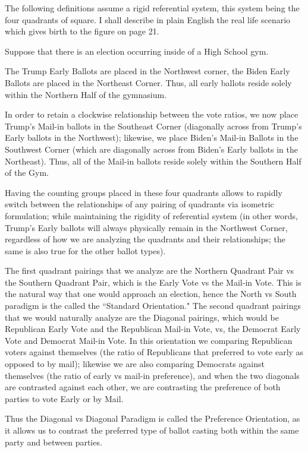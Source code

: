 The following definitions assume a rigid referential system, this system being the four quadrants of square. I shall describe in plain English the real life scenario which gives birth to the figure on page 21.

Suppose that there is an election occurring inside of a High School gym. 

The Trump Early Ballots are placed in the Northwest corner, the Biden Early Ballots are placed in the Northeast Corner. Thus, all early ballots reside solely within the Northern Half of the gymnasium.

In order to retain a clockwise relationship between the vote ratios, we now place Trump's Mail-in ballots in the Southeast Corner (diagonally across from Trump's Early ballots in the Northwest); likewise, we place Biden's Mail-in Ballots in the Southwest Corner (which are diagonally across from Biden's Early ballots in the Northeast). Thus, all of the Mail-in ballots reside solely within the Southern Half of the Gym.

Having the counting groups placed in these four quadrants allows to rapidly switch between the relationships of any pairing of quadrants via isometric formulation; while maintaining the rigidity of referential system (in other words, Trump's Early ballots will always physically remain in the Northwest Corner, regardless of how we are analyzing the quadrants and their relationships; the same is also true for the other ballot types).

The first quadrant pairings that we analyze are the Northern Quadrant Pair vs the Southern Quadrant Pair, which is the Early Vote vs the Mail-in Vote. This is the natural way that one would approach an election, hence the North vs South paradigm is the called the ``Standard Orientation."
\newpage
The second quadrant pairings that we would naturally analyze are the Diagonal pairings, which would be Republican Early Vote and the Republican Mail-in Vote, vs, the Democrat Early Vote and Democrat Mail-in Vote. In this orientation we comparing Republican voters against themselves (the ratio of Republicans that preferred to vote early as opposed to by mail); likewise we are also comparing Democrats against themselves (the ratio of early vs mail-in preference), and when the two diagonals are contrasted against each other, we are contrasting the preference of both parties to vote Early or by Mail.

Thus the Diagonal vs Diagonal Paradigm is called the Preference Orientation, as it allows us to contrast the preferred type of ballot casting both within the same party and between parties.

